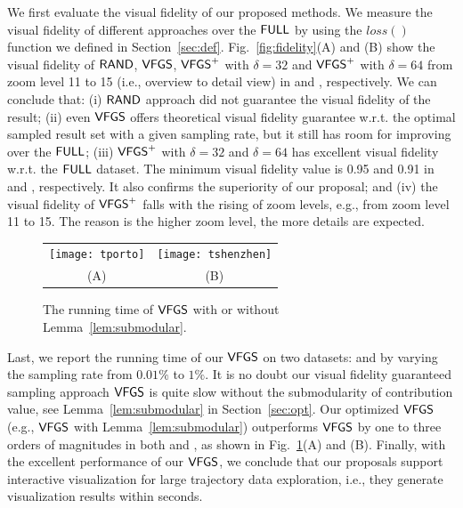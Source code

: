 We first evaluate the visual fidelity of our proposed methods.
We measure the visual fidelity of different approaches over the $\mathsf{FULL}$ by using the $loss()$ function we defined in Section~\ref{sec:def}.
Fig.~\ref{fig:fidelity}(A) and (B) show the visual fidelity of $\mathsf{RAND}$, $\mathsf{VFGS}$, $\mathsf{VFGS}^{+}$ with $\delta=32$ and $\mathsf{VFGS}^{+}$ with $\delta=64$ from zoom level 11 to 15 (i.e., overview to detail view) in
\pt{} and \sz{}, respectively.
We can conclude that: (i) $\mathsf{RAND}$ approach did not guarantee the visual fidelity of the result;
(ii) even $\mathsf{VFGS}$ offers theoretical visual fidelity guarantee w.r.t. the optimal sampled result set with a given sampling rate, but it still has room for improving over the $\mathsf{FULL}$;
(iii) $\mathsf{VFGS}^{+}$ with $\delta=32$ and $\delta=64$ has excellent visual fidelity w.r.t. the $\mathsf{FULL}$ dataset. The minimum visual fidelity value is 0.95 and 0.91 in \pt{} and \sz{}, respectively.
It also confirms the superiority of our proposal;
and (iv) the visual fidelity of $\mathsf{VFGS}^{+}$ falls with the rising of zoom levels, e.g., from zoom level 11 to 15.
The reason is the higher zoom level, the more details are expected.


\begin{figure}
 \centering
 \small
 \begin{tabular}{cc}
   \texttt{[image: tporto]}
   &
   \texttt{[image: tshenzhen]}
   \\
   (A) \pt{}
   &
   (B) \sz{}	
 \end{tabular}
 \vspace{-3mm}
 \caption{The running time of $\mathsf{VFGS}$ with or without Lemma~\ref{lem:submodular}.}
 \label{fig:cost}
 \vspace{-4mm}
\end{figure}


Last, we report the running time of our $\mathsf{VFGS}$ on two datasets: \pt{} and \sz{} by varying the sampling rate from $0.01\%$ to $1\%$.
It is no doubt our visual fidelity guaranteed sampling approach $\mathsf{VFGS}$ is quite slow without the submodularity of contribution value, see Lemma~\ref{lem:submodular} in Section~\ref{sec:opt}.
Our optimized $\mathsf{VFGS}$ (e.g., $\mathsf{VFGS}$ with Lemma~\ref{lem:submodular}) outperforms $\mathsf{VFGS}$ by one to three orders of magnitudes in both \pt{} and \sz{}, as shown in Fig.~\ref{fig:cost}(A) and (B).
Finally, with the excellent performance of our $\mathsf{VFGS}$, we conclude that our proposals support interactive visualization for large trajectory data exploration, i.e., they generate visualization results within seconds.

